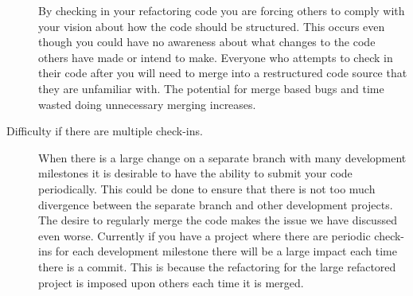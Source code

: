 \begin{description}
    By checking in your refactoring code you are forcing others to comply with your vision about how the code should be structured.  This occurs even though you could have no awareness about what changes to the code others have made or intend to make.  Everyone who attempts to check in their code after you will need to merge into a restructured code source that they are unfamiliar with.  The potential for merge based bugs and time wasted doing unnecessary merging increases.

  \item [Difficulty if there are multiple check-ins.] 
    When there is a large change on a separate branch with many development milestones it is desirable to have the ability to submit your code periodically.  This could be done to ensure that there is not too much divergence between the separate branch and other development projects. The desire to regularly merge the code makes the issue we have discussed even worse. Currently if you have a project where there are periodic check-ins for each development milestone there will be a large impact each time there is a commit. This is because the refactoring for the large refactored project is imposed upon others each time it is merged.


\end{description}
